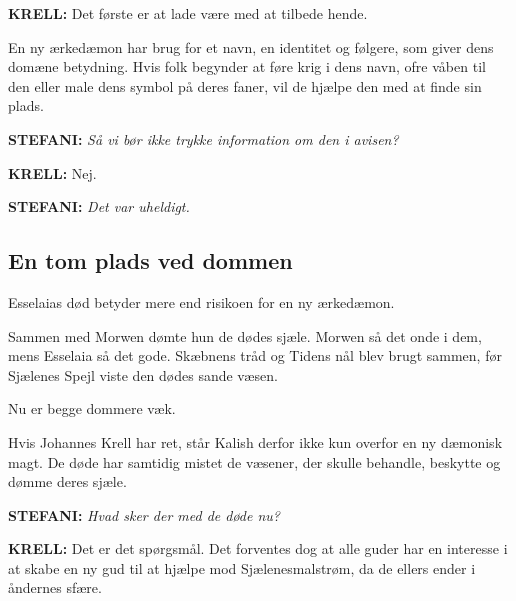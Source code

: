 \documentclass[a4paper,12pt]{memoir}
\begin{document}
\noindent
{\sffamily\bfseries KRELL:}
Det første er at lade være med at tilbede hende.

En ny ærkedæmon har brug for et navn, en identitet og
følgere, som giver dens domæne betydning. Hvis folk
begynder at føre krig i dens navn, ofre våben til den eller
male dens symbol på deres faner, vil de hjælpe den med at
finde sin plads.

\par\medskip

\noindent
{\sffamily\bfseries\color{Maroon!90!black} STEFANI:}
\textit{Så vi bør ikke trykke information om den i avisen?}

\par\smallskip

\noindent
{\sffamily\bfseries KRELL:}
Nej.

\par\medskip

\noindent
{\sffamily\bfseries\color{Maroon!90!black} STEFANI:}
\textit{Det var uheldigt.}

\subsection*{En tom plads ved dommen}

Esselaias død betyder mere end risikoen for en ny ærkedæmon.

Sammen med Morwen dømte hun de dødes sjæle. Morwen så
det onde i dem, mens Esselaia så det gode. Skæbnens tråd og
Tidens nål blev brugt sammen, før Sjælenes Spejl viste den
dødes sande væsen.

Nu er begge dommere væk.

Hvis Johannes Krell har ret, står Kalish derfor ikke kun overfor en ny dæmonisk magt. De døde har samtidig mistet de
væsener, der skulle behandle, beskytte og dømme deres sjæle.

\par\medskip

\noindent
{\sffamily\bfseries\color{Maroon!90!black} STEFANI:}
\textit{Hvad sker der med de døde nu?}

\par\smallskip

\noindent
{\sffamily\bfseries KRELL:}
Det er det spørgsmål. Det forventes dog at alle guder har en interesse i at skabe en ny gud til at hjælpe mod Sjælenesmalstrøm, da de ellers ender i åndernes sfære.

\par\medskip
\end{document}

